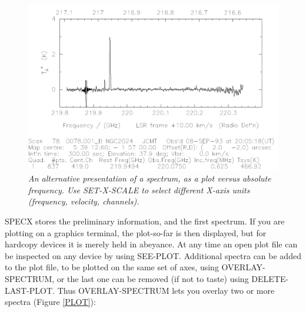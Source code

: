 \documentclass[11pt,twoside]{report}
\begin{document}
\begin{figure}[htbp]
\begin{center}
\includegraphics[scale=0.65]{image}
\protect\parbox{5.5in}
{\caption[IMAGE]
{\sl
An alternative presentation of a spectrum, as a plot versus absolute
frequency. Use SET-X-SCALE to select different X-axis units (frequency,
velocity, channels).
\label{IMAGE}
}
}
\end{center}
\end{figure}
SPECX stores the preliminary information, and the
first spectrum. If you are plotting on a graphics terminal, the plot-so-far is
then displayed, but for hardcopy devices it is merely held in abeyance. At any
time an open plot file can be inspected on any device by using SEE-PLOT.
Additional spectra can be added to the plot file, to be plotted on the same set
of axes, using OVERLAY-SPECTRUM, or the last one can be removed (if not to taste)
using DELETE-LAST-PLOT. Thus OVERLAY-SPECTRUM lets you overlay two or more
spectra (Figure \ref{PLOT}):
\end{document}
